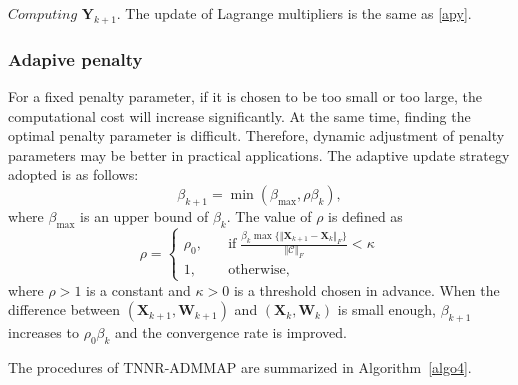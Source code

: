 \documentclass[fontset=windows]{article}
\begin{document}
{$\textit{Computing}$  $\mathbf Y_{k+1}$. The update of Lagrange multipliers is the same as \eqref{apy}.

\subsubsection{Adapive penalty}
For a fixed penalty parameter, if it is chosen to be too small or too large, the computational cost will increase significantly. At the same time, finding the optimal penalty parameter is difficult. Therefore, dynamic adjustment of penalty parameters may be better in practical applications. The adaptive update strategy adopted is as follows:
\begin{equation}
    \beta_{k+1} = \min(\beta_{\max}, \rho \beta_k),\label{beta1}
\end{equation}
where $\beta_{\max}$ is an upper bound of $\beta_k$. The value of $\rho$ is defined as
\begin{equation}
    \rho = \left\{
        \begin{aligned}
            \rho_0, \quad & \text{if} \; \frac{\beta_k \max\{ \Vert\mathbf X_{k+1} - \mathbf X_k \Vert_F \}}{ \Vert \mathcal{C} \Vert_F} < \kappa \\
            1, \quad & \text{otherwise},
        \end{aligned}
    \right.
    \label{beta2}
\end{equation}
where $\rho > 1$ is a constant and $\kappa >0 $ is a threshold chosen in advance. When the difference between $(\mathbf X_{k+1}, \mathbf W_{k+1})$ and $(\mathbf X_{k}, \mathbf W_{k})$ is small enough, $\beta_{k+1}$ increases to $\rho_0\beta_k$ and the convergence rate is improved.

The procedures of TNNR-ADMMAP are summarized in Algorithm~\ref{algo4}.

}
\end{document}
